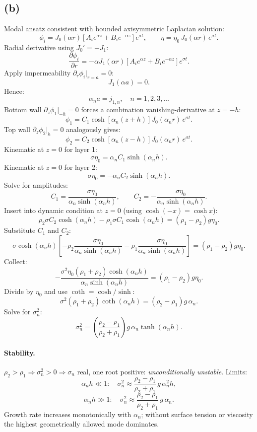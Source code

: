 \documentclass[11pt]{article}
\newcommand{\pd}[2]{\frac{\partial #1}{\partial #2}}
\begin{document}
\subsection*{(b)}

Modal ansatz consistent with bounded axisymmetric Laplacian solution:
\[ \phi_i = J_0(\alpha r)\!\left[A_i e^{\alpha z}+B_i e^{-\alpha z}\right]e^{\sigma t},\qquad \eta = \eta_0\,J_0(\alpha r)\,e^{\sigma t}. \]
Radial derivative using $J_0'=-J_1$:
\[ \pd{\phi_i}{r} = -\alpha J_1(\alpha r)\!\left[A_i e^{\alpha z}+B_i e^{-\alpha z}\right]e^{\sigma t}. \]
Apply impermeability $\partial_r\phi_i|_{r=a}=0$:
\[ J_1(\alpha a) = 0. \]
Hence:
\[ \boxed{\;\alpha_n a = j_{1,n},\quad n=1,2,3,\dots\;} \]
Bottom wall $\partial_z\phi_1|_{-h}=0$ forces a combination vanishing-derivative at $z=-h$:
\[ \phi_1 = C_1\cosh\!\left[\alpha_n(z+h)\right]J_0(\alpha_n r)\,e^{\sigma t}. \]
Top wall $\partial_z\phi_2|_{h}=0$ analogously gives:
\[ \phi_2 = C_2\cosh\!\left[\alpha_n(z-h)\right]J_0(\alpha_n r)\,e^{\sigma t}. \]
Kinematic at $z=0$ for layer 1:
\[ \sigma\eta_0 = \alpha_n C_1\sinh(\alpha_n h). \]
Kinematic at $z=0$ for layer 2:
\[ \sigma\eta_0 = -\alpha_n C_2\sinh(\alpha_n h). \]
Solve for amplitudes:
\[ C_1 = \frac{\sigma\eta_0}{\alpha_n\sinh(\alpha_n h)},\qquad C_2 = -\frac{\sigma\eta_0}{\alpha_n\sinh(\alpha_n h)}. \]
Insert into dynamic condition at $z=0$ (using $\cosh(-x)=\cosh x$):
\[ \rho_2\sigma C_2\cosh(\alpha_n h) - \rho_1\sigma C_1\cosh(\alpha_n h) = (\rho_1-\rho_2)g\eta_0. \]
Substitute $C_1$ and $C_2$:
\[ \sigma\cosh(\alpha_n h)\!\left[-\rho_2\frac{\sigma\eta_0}{\alpha_n\sinh(\alpha_n h)} - \rho_1\frac{\sigma\eta_0}{\alpha_n\sinh(\alpha_n h)}\right] = (\rho_1-\rho_2)g\eta_0. \]
Collect:
\[ -\frac{\sigma^2\eta_0(\rho_1+\rho_2)\cosh(\alpha_n h)}{\alpha_n\sinh(\alpha_n h)} = (\rho_1-\rho_2)g\eta_0. \]
Divide by $\eta_0$ and use $\coth = \cosh/\sinh$:
\[ \sigma^2(\rho_1+\rho_2)\coth(\alpha_n h) = (\rho_2-\rho_1)g\,\alpha_n. \]
Solve for $\sigma_n^2$:
\[ \boxed{\;\sigma_n^2 = \!\left(\frac{\rho_2-\rho_1}{\rho_2+\rho_1}\right)\!g\,\alpha_n\tanh(\alpha_n h).\;} \]

\paragraph{Stability.} $\rho_2>\rho_1\Rightarrow\sigma_n^2>0\Rightarrow\sigma_n$ real, one root positive: \emph{unconditionally unstable}. Limits:
\[ \alpha_n h\ll 1:\quad \sigma_n^2 \approx \frac{\rho_2-\rho_1}{\rho_2+\rho_1}\,g\,\alpha_n^2 h, \]
\[ \alpha_n h\gg 1:\quad \sigma_n^2 \approx \frac{\rho_2-\rho_1}{\rho_2+\rho_1}\,g\,\alpha_n. \]
Growth rate increases monotonically with $\alpha_n$; without surface tension or viscosity the highest geometrically allowed mode dominates.
\end{document}
